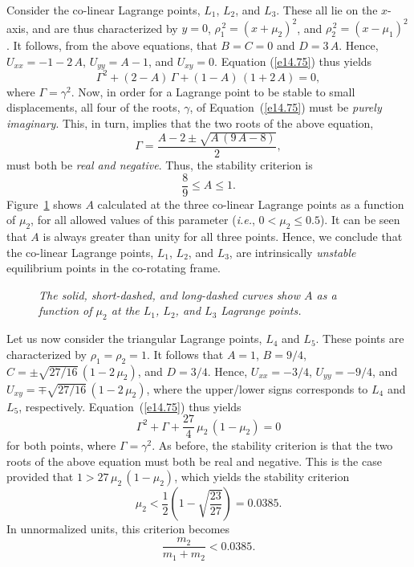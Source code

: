 Consider the co-linear Lagrange points, $L_1$, $L_2$, and $L_3$. These all
lie on the $x$-axis, and are thus characterized by
$y=0$, $\rho_1^{\,2} = (x+\mu_2)^2$, and $\rho_2^{\,2} = (x-\mu_1)^2$. It follows,
from the above equations, that $B=C=0$ and $D=3\,A$. Hence, $U_{xx}=-1-2\,A$,
$U_{yy} = A-1$, and $U_{xy}=0$. Equation (\ref{e14.75}) thus yields
\begin{equation}
\Gamma^2 + (2-A)\,\Gamma + (1-A)\,(1+2\,A) = 0,
\end{equation}
where $\Gamma=\gamma^2$. Now, in order for a Lagrange point to be stable
to small displacements, all four of the roots, $\gamma$,  of Equation~(\ref{e14.75}) must
be {\em purely imaginary}. This, in turn, implies that the two roots of
the above equation,
\begin{equation}
\Gamma = \frac{A-2\pm\sqrt{A\,(9\,A-8)}}{2},
\end{equation}
 must both be {\em real and negative}.
Thus, the stability criterion is
\begin{equation}
\frac{8}{9}\leq A \leq 1.
\end{equation}
Figure~\ref{fa} shows $A$  calculated at the three co-linear Lagrange points  as a function of $\mu_2$, for all
allowed values of this parameter ({\em i.e.}, $0<\mu_2\leq 0.5$). It can be seen that $A$
is always greater than unity for all three points. Hence, we conclude that the co-linear
Lagrange points, $L_1$, $L_2$, and $L_3$, are intrinsically {\em unstable}\/ equilibrium points in the co-rotating
frame.

\begin{figure}
\epsfysize=2.5in
\centerline{}
\caption{\em The solid, short-dashed, and long-dashed curves show $A$ as a function of $\mu_2$ at the
$L_1$, $L_2$, and $L_3$ Lagrange points.}\label{fa}
\end{figure}

Let us now consider the triangular Lagrange points, $L_4$ and $L_5$. These points
are characterized by $\rho_1=\rho_2=1$. It follows that $A=1$, $B=9/4$, $C=\pm\sqrt{27/16}\,(1-2\,\mu_2)$,
and $D=3/4$. Hence, $U_{xx} = -3/4$, $U_{yy}=-9/4$, and $U_{xy} = \mp\sqrt{27/16}\,(1-2\,\mu_2)$,
where the upper/lower signs corresponds to $L_4$ and $L_5$, respectively.
Equation~(\ref{e14.75}) thus yields
\begin{equation}
\Gamma^2 + \Gamma + \frac{27}{4}\,\mu_2\,(1-\mu_2) = 0
\end{equation}
for both points,
where $\Gamma=\gamma^2$. As before, the stability criterion is that the two roots of the
above  equation must both be
real and negative. This is the case provided that $1 > 27\,\mu_2\,(1-\mu_2)$, which
yields the stability criterion
\begin{equation}
\mu_2 < \frac{1}{2}\left(1-\sqrt{\frac{23}{27}}\right) = 0.0385.
\end{equation}
In unnormalized units, this criterion becomes
\begin{equation}
\frac{m_2}{m_1+ m_2} < 0.0385.
\end{equation}

